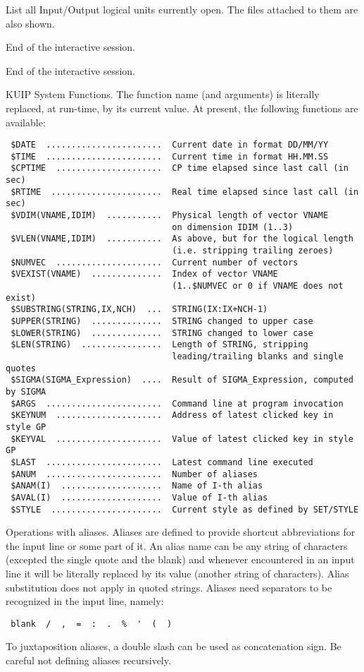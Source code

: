 \BEGTEXT
List all Input/Output logical units currently open.
The files attached to them are also shown.
\ENDTEXT

\BEGTEXT
End of the interactive session.
\ENDTEXT

\BEGTEXT
End of the interactive session.
\ENDTEXT

\BEGTEXT
KUIP System Functions.
The function name (and arguments) is literally replaced,
at run-time, by its current value.
At present, the following functions are available:
\begin{verbatim}
 $DATE  .......................  Current date in format DD/MM/YY
 $TIME  .......................  Current time in format HH.MM.SS
 $CPTIME  .....................  CP time elapsed since last call (in sec)
 $RTIME  ......................  Real time elapsed since last call (in sec)
 $VDIM(VNAME,IDIM)  ...........  Physical length of vector VNAME
                                 on dimension IDIM (1..3)
 $VLEN(VNAME,IDIM)  ...........  As above, but for the logical length
                                 (i.e. stripping trailing zeroes)
 $NUMVEC  .....................  Current number of vectors
 $VEXIST(VNAME)  ..............  Index of vector VNAME
                                 (1..$NUMVEC or 0 if VNAME does not exist)
 $SUBSTRING(STRING,IX,NCH)  ...  STRING(IX:IX+NCH-1)
 $UPPER(STRING)  ..............  STRING changed to upper case
 $LOWER(STRING)  ..............  STRING changed to lower case
 $LEN(STRING)  ................  Length of STRING, stripping
                                 leading/trailing blanks and single quotes
 $SIGMA(SIGMA_Expression)  ....  Result of SIGMA_Expression, computed by SIGMA
 $ARGS  .......................  Command line at program invocation
 $KEYNUM  .....................  Address of latest clicked key in style GP
 $KEYVAL  .....................  Value of latest clicked key in style GP
 $LAST  .......................  Latest command line executed
 $ANUM  .......................  Number of aliases
 $ANAM(I)  ....................  Name of I-th alias
 $AVAL(I)  ....................  Value of I-th alias
 $STYLE  ......................  Current style as defined by SET/STYLE
\end{verbatim}
\ENDTEXT


\BEGTEXT
Operations with aliases.
Aliases are defined to provide shortcut abbreviations for the input line or
some part of it. An alias name can be any string of characters
(excepted the single quote and the blank) and whenever encountered
in an input line it will be literally replaced by its value (another string
of characters).
Alias substitution does not apply in quoted strings.
Aliases need separators to be recognized in the input line, namely:
\begin{verbatim}
 blank  /  ,  =  :  .  %  '  (  )
\end{verbatim}
To juxtaposition aliases, a double slash can be used as concatenation sign.
Be careful not defining aliases recursively.
\ENDTEXT

